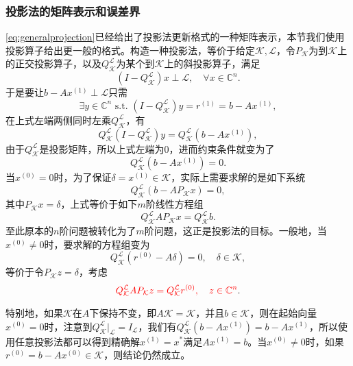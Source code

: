 \documentclass[a4paper,10pt]{ctexart}
\begin{document}
\subsubsection{投影法的矩阵表示和误差界}
\eqref{eq:generalprojection}已经给出了投影法更新格式的一种矩阵表示，本节我们使用投影算子给出更一般的格式。构造一种投影法，等价于给定$ \mathcal{K},\mathcal{L} $，令$ P_{\mathcal{K}} $为到$ \mathcal{K} $上的正交投影算子，以及$ Q_{\mathcal{K}}^{\mathcal{L}} $为某个到$ \mathcal{K} $上的斜投影算子，满足
\[
    (I - Q_{\mathcal{K}}^{\mathcal{L}})x \perp \mathcal{L},\quad \forall x\in \mathbb{C}^n.
\]
于是要让$ b - A x^{(1)}\perp \mathcal{L} $只需
\[
    \exists y\in \mathbb{C}^n \text{ s.t. } (I-Q_{\mathcal{K}}^{\mathcal{L}})y = r^{(1)} = b-Ax^{(1)},
\]
在上式左端两侧同时左乘$ Q_{\mathcal{K}}^{\mathcal{L}} $，有
\[
    Q_{\mathcal{K}}^{\mathcal{L}}(I - Q_{\mathcal{K}}^{\mathcal{L}})y = Q_{\mathcal{K}}^{\mathcal{L}} (b-Ax^{(1)}),
\]
由于$ Q_{\mathcal{K}}^{\mathcal{L}} $是投影矩阵，所以上式左端为$ 0 $，进而约束条件就变为了
\begin{equation}
    Q_{\mathcal{K}}^{\mathcal{L}} (b-Ax^{(1)}) = 0.
\end{equation}
当$ x^{(0)} = 0 $时，为了保证$ \delta = x^{(1)}\in \mathcal{K} $，实际上需要求解的是如下系统
\begin{equation}
    Q_{\mathcal{K}}^{\mathcal{L}} (b-AP_{\mathcal{K}}x) = 0,
\end{equation}
其中$ P_{\mathcal{K}}x = \delta $，上式等价于如下$ m $阶线性方程组
\begin{equation}
    Q_{\mathcal{K}}^{\mathcal{L}}AP_{\mathcal{K}}x =  Q_{\mathcal{K}}^{\mathcal{L}}b.
\end{equation}
至此原本的$ n $阶问题被转化为了$ m $阶问题，这正是投影法的目标。一般地，当$ x^{(0)}\ne 0 $时，要求解的方程组变为
\begin{equation}
    Q_{\mathcal{K}}^{\mathcal{L}}(r^{(0)} - A \delta) = 0,\quad \delta\in \mathcal{K},
\end{equation}
等价于令$ P_{\mathcal{K}}z = \delta $，考虑
\begin{equation}
    \textcolor{red}{Q_{\mathcal{K}}^{\mathcal{L}}AP_{\mathcal{K}} z = Q_{\mathcal{K}}^{\mathcal{L}}r^{(0)},\quad z\in \mathbb{C}^n}.
\end{equation}

特别地，如果$ \mathcal{K} $在$ A $下保持不变，即$ A \mathcal{K} = \mathcal{K} $，并且$ b \in \mathcal{K} $，则在起始向量$ x^{(0)} = 0 $时，注意到$ Q_{\mathcal{K}}^{\mathcal{L}}|_{\mathcal{L}} = I_{\mathcal{L}} $，我们有$ Q_{\mathcal{K}}^{\mathcal{L}} (b-Ax^{(1)}) = b-Ax^{(1)} $，所以使用任意投影法都可以得到精确解$ x^{(1)} = x^* $满足$ A x^{(1)} = b $。当$ x^{(0)}\ne 0 $时，如果$ r^{(0)} = b - Ax^{(0)}\in \mathcal{K} $，则结论仍然成立。
\end{document}
